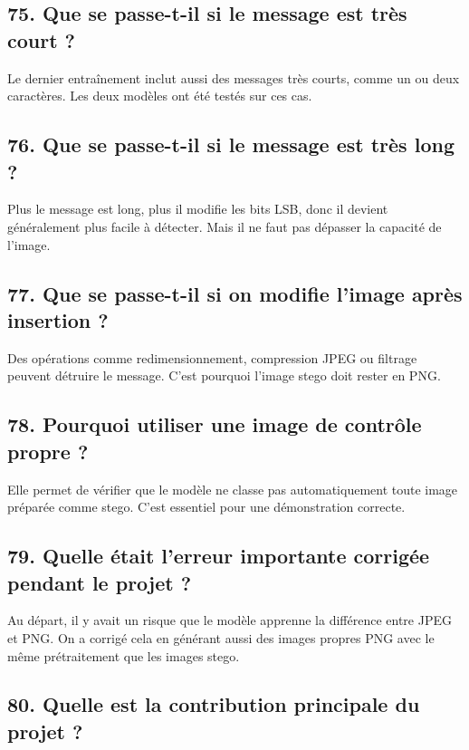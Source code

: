 \documentclass[11pt,a4paper]{article}
\begin{document}
\subsection{75. Que se passe-t-il si le message est très court ?}

Le dernier entraînement inclut aussi des messages très courts, comme un ou deux caractères. Les deux modèles ont été testés sur ces cas.

\subsection{76. Que se passe-t-il si le message est très long ?}

Plus le message est long, plus il modifie les bits LSB, donc il devient généralement plus facile à détecter. Mais il ne faut pas dépasser la capacité de l'image.

\subsection{77. Que se passe-t-il si on modifie l'image après insertion ?}

Des opérations comme redimensionnement, compression JPEG ou filtrage peuvent détruire le message. C'est pourquoi l'image stego doit rester en PNG.

\subsection{78. Pourquoi utiliser une image de contrôle propre ?}

Elle permet de vérifier que le modèle ne classe pas automatiquement toute image préparée comme stego. C'est essentiel pour une démonstration correcte.

\subsection{79. Quelle était l'erreur importante corrigée pendant le projet ?}

Au départ, il y avait un risque que le modèle apprenne la différence entre JPEG et PNG. On a corrigé cela en générant aussi des images propres PNG avec le même prétraitement que les images stego.

\subsection{80. Quelle est la contribution principale du projet ?}
\end{document}
